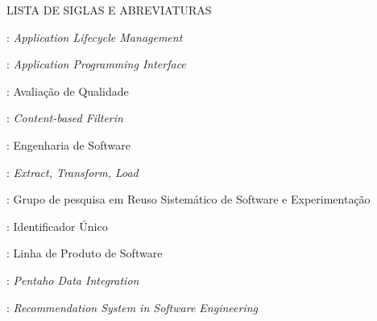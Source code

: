 \clearpage
\thispagestyle{empty}

\noindent{\large\bf\dadoTituloAbs}
\noindent{\large\dadoSubTituloAbs}

\normalsize
\begin{center}
	LISTA DE SIGLAS E ABREVIATURAS
\end{center}


: \textit{Application Lifecycle Management}

: \textit{Application Programming Interface}

: Avaliação de Qualidade

: \textit{Content-based Filterin}

: Engenharia de Software

: \textit{Extract, Transform, Load}

: Grupo de pesquisa em Reuso Sistemático de Software e Experimentação

: Identificador Único

: Linha de Produto de Software

: \textit{Pentaho Data Integration}

: \textit{Recommendation System in Software Engineering}


\pagebreak